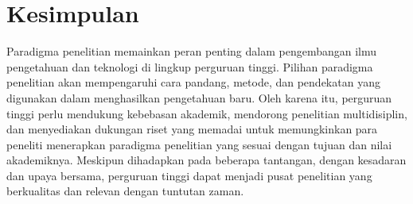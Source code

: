 \section{Kesimpulan}

Paradigma penelitian memainkan peran penting dalam pengembangan ilmu pengetahuan dan teknologi di lingkup perguruan tinggi. Pilihan paradigma penelitian akan mempengaruhi cara pandang, metode, dan pendekatan yang digunakan dalam menghasilkan pengetahuan baru. Oleh karena itu, perguruan tinggi perlu mendukung kebebasan akademik, mendorong penelitian multidisiplin, dan menyediakan dukungan riset yang memadai untuk memungkinkan para peneliti menerapkan paradigma penelitian yang sesuai dengan tujuan dan nilai akademiknya. Meskipun dihadapkan pada beberapa tantangan, dengan kesadaran dan upaya bersama, perguruan tinggi dapat menjadi pusat penelitian yang berkualitas dan relevan dengan tuntutan zaman.